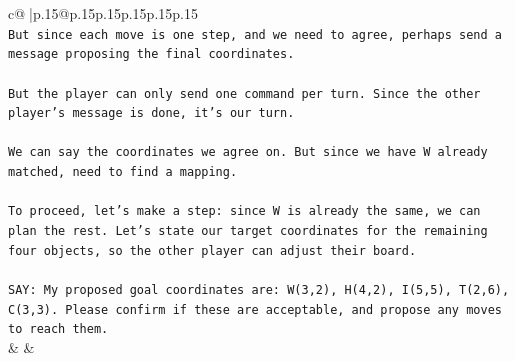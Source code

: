 \documentclass{article}
\begin{document}
{\begin{supertabular}{c@{$\;$}|p{.15\linewidth}@{}p{.15\linewidth}p{.15\linewidth}p{.15\linewidth}p{.15\linewidth}p{.15\linewidth}}
{{{\\ 
\texttt{But since each move is one step, and we need to agree, perhaps send a message proposing the final coordinates.} \\
\\ 
\texttt{But the player can only send one command per turn. Since the other player's message is done, it's our turn.} \\
\\ 
\texttt{We can say the coordinates we agree on. But since we have W already matched, need to find a mapping.} \\
\\ 
\texttt{To proceed, let's make a step: since W is already the same, we can plan the rest. Let's state our target coordinates for the remaining four objects, so the other player can adjust their board.} \\
\\ 
\texttt{SAY: My proposed goal coordinates are: W(3,2), H(4,2), I(5,5), T(2,6), C(3,3). Please confirm if these are acceptable, and propose any moves to reach them.} \\
            }
        }
    }
    & & \\ \\


\end{supertabular}}
\end{document}
